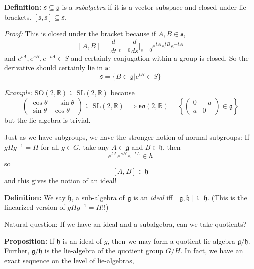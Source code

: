 \documentclass[12pt]{article}
\newcommand{\R}{\mathbb{R}}
\newcommand{\SL}{\text{SL}}
\newcommand{\SO}{\text{SO}}
\newcommand{\g}{\mathfrak{g}}
\renewcommand{\sf}{\mathfrak{s}}
\newcommand{\h}{\mathfrak{h}}
\newenvironment*{tbox}[2][gray]{
    \begin{tcolorbox}[
        parbox=false,
        colback=#1!5!white,
        colframe=#1!75!black,
        breakable,
        title={#2}
    ]}
    {\end{tcolorbox}}
\begin{document}
    \textbf{Definition:} $\mathfrak{s} \subseteq \g$ is a \emph{subalgebra} if it is a vector subspace and closed under lie-brackets. $[\mathfrak{s}, \mathfrak{s}] \subseteq \mathfrak{s}$.

    \begin{tbox}{\textbf{Theorem:} There is a correspondence between sub-algebras of $\g$ and connected lie-subgroups of $G$. 
        \[S \subseteq G \to T_1 S \subseteq T_1 G \implies \sf \subseteq \g\]}
    
        \emph{Proof:} This is closed under the bracket because if $A, B \in \sf$, 
        \[[A, B] = \frac{d}{dt}\bigg\vert_{t=0} \frac{d}{ds}\bigg\vert_{s=0} e^{tA}e^{tB}e^{-tA}\] 
        and $e^{tA}, e^{sB}, e^{-tA} \in S$ and certainly conjugation within a group is closed. So the derivative should certainly lie in $\sf$: 
        \[\sf = \{B \in \g \big\vert e^{tB} \in S\}\]
    \end{tbox}

    \emph{Example:} $\SO(2, \R) \subseteq \SL(2, \R)$ because 
    \[\begin{pmatrix}
        \cos \theta & -\sin \theta\\ 
        \sin \theta & \cos \theta
    \end{pmatrix} \subseteq \SL(2, \R) \implies \mathfrak{so}(2, \R) = \left\{\begin{pmatrix}
        0 & -a\\ 
        a & 0
    \end{pmatrix} \in \g\right\}\]
    but the lie-algebra is trivial. 

    Just as we have subgroups, we have the stronger notion of normal subgroups: If $gHg^{-1} = H$ for all $g \in G$, take any $A \in \g$ and $B \in \mathfrak{h}$, then 
    \[e^{tA}e^{sB}e^{-tA} \in h\]
    so 
    \[[A, B] \in \mathfrak{h}\]
    and this gives the notion of an ideal!

    \textbf{Definition:} We say $\mathfrak{h}$, a sub-algebra of $\g$ is an \emph{ideal} iff $[\g, \mathfrak{h}] \subseteq \mathfrak{h}$. (This is the linearized version of $gHg^{-1} = H$!!)

    Natural question: If we have an ideal and a subalgebra, can we take quotients? 

    \textbf{Proposition:} If $\mathfrak{h}$ is an ideal of $g$, then we may form a quotient lie-algebra $\g/\h$. Further, $\g/\h$ is the lie-algebra of the quotient group $G/H$. In fact, we have an exact sequence on the level of lie-algebras,
\end{document}
